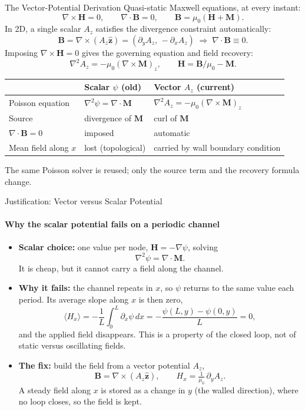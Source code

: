 \documentclass[aspectratio=43,10pt]{beamer}
\begin{document}
\begin{frame}{The Vector-Potential Derivation}
  \small
  Quasi-static Maxwell equations, at every instant:
  \[ \nabla\times\bm H=0,\qquad \nabla\cdot\bm B=0,\qquad \bm B=\mu_0(\bm H+\bm M). \]
  In 2D, a single scalar $A_z$ satisfies the divergence constraint automatically:
  \[ \bm B=\nabla\times(A_z\hat{\bm z})=(\partial_y A_z,\,-\partial_x A_z)\;\Longrightarrow\;\nabla\cdot\bm B\equiv 0. \]
  Imposing $\nabla\times\bm H=0$ gives the governing equation and field recovery:
  \[ \nabla^2 A_z=-\mu_0(\nabla\times\bm M)_z,\qquad \bm H=\bm B/\mu_0-\bm M. \]
  \vspace{-0.15cm}
  \begin{center}\scriptsize
  \begin{tabular}{lll}
    \toprule
     & \textbf{Scalar $\psi$ (old)} & \textbf{Vector $A_z$ (current)} \\
    \midrule
    Poisson equation   & $\nabla^2\psi=\nabla\cdot\bm M$ & $\nabla^2 A_z=-\mu_0(\nabla\times\bm M)_z$\\
    Source             & divergence of $\bm M$ & curl of $\bm M$ \\
    $\nabla\cdot\bm B=0$ & imposed & automatic \\
    Mean field along $x$ & lost (topological) & carried by wall boundary condition \\
    \bottomrule
  \end{tabular}
  \end{center}
  \centering\scriptsize The same Poisson solver is reused; only the source term and the recovery formula change.
\end{frame}

\begin{frame}{Justification: Vector versus Scalar Potential}
  \framesubtitle{Why the scalar potential fails on a periodic channel}
  \small
  \begin{itemize}
    \item \textbf{Scalar choice:} one value per node, $\bm H=-\nabla\psi$, solving
      \[ \nabla^2\psi=\nabla\cdot\bm M . \]
      It is cheap, but it cannot carry a field along the channel.
    \item \textbf{Why it fails:} the channel repeats in $x$, so $\psi$ returns to the same value each period. Its average slope along $x$ is then zero,
      \[ \langle H_x\rangle=-\frac{1}{L}\int_0^L \partial_x\psi\,dx=-\frac{\psi(L,y)-\psi(0,y)}{L}=0, \]
      and the applied field disappears. This is a property of the closed loop, not of static versus oscillating fields.
    \item \textbf{The fix:} build the field from a vector potential $A_z$,
      \[ \bm B=\nabla\times(A_z\hat{\bm z}),\qquad H_x=\tfrac{1}{\mu_0}\,\partial_y A_z . \]
      A steady field along $x$ is stored as a change in $y$ (the walled direction), where no loop closes, so the field is kept.
  \end{itemize}
\end{frame}
\end{document}
